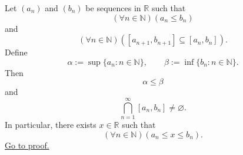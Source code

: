 \begin{theorem}
\label{thm:nested-interval-theorem}
Let $(a_n)$ and $(b_n)$ be sequences in $\mathbb{R}$ such that
\[
  (\forall n\in\mathbb{N})(a_n\leq b_n)
\]
and
\[
  (\forall n\in\mathbb{N})([a_{n+1},b_{n+1}]\subseteq [a_n,b_n]).
\]
Define
\[
  \alpha:=\sup\{a_n:n\in\mathbb{N}\},
  \qquad
  \beta:=\inf\{b_n:n\in\mathbb{N}\}.
\]
Then
\[
  \alpha\leq\beta
\]
and
\[
  \bigcap_{n=1}^{\infty}[a_n,b_n]\neq\varnothing.
\]
In particular, there exists $x\in\mathbb{R}$ such that
\[
  (\forall n\in\mathbb{N})(a_n\leq x\leq b_n).
\]
\hyperref[prf:nested-interval-theorem]{Go to proof.}
\end{theorem}
